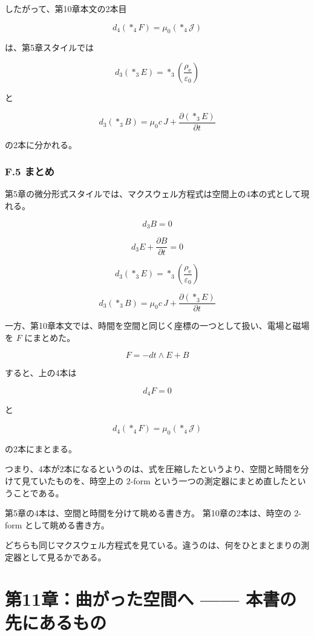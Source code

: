 \documentclass[a4paper,12pt,openany]{book}
\begin{document}
したがって、第10章本文の2本目

\[
d_4(\ast_4F)=\mu_0(\ast_4\mathcal J)
\]

は、第5章スタイルでは

\[
d_3(\ast_3E)=\ast_3\left(\frac{\rho_{\mathrm e}}{\varepsilon_0}\right)
\]

と

\[
d_3(\ast_3B)=\mu_0 c\,J+\frac{\partial(\ast_3E)}{\partial t}
\]

の2本に分かれる。

\hypertarget{f.5-ux307eux3068ux3081}{%
\subsection*{F.5 まとめ}\label{f.5-ux307eux3068ux3081}}

第5章の微分形式スタイルでは、マクスウェル方程式は空間上の4本の式として現れる。

\[
d_3B=0
\]

\[
d_3E+\frac{\partial B}{\partial t}=0
\]

\[
d_3(\ast_3E)=\ast_3\left(\frac{\rho_{\mathrm e}}{\varepsilon_0}\right)
\]

\[
d_3(\ast_3B)=\mu_0 c\,J+\frac{\partial(\ast_3E)}{\partial t}
\]

一方、第10章本文では、時間を空間と同じく座標の一つとして扱い、電場と磁場を
\(F\) にまとめた。

\[
F=-dt\wedge E+B
\]

すると、上の4本は

\[
d_4F=0
\]

と

\[
d_4(\ast_4F)=\mu_0(\ast_4\mathcal J)
\]

の2本にまとまる。

つまり、4本が2本になるというのは、式を圧縮したというより、空間と時間を分けて見ていたものを、時空上の
\(2\)-form という一つの測定器にまとめ直したということである。

第5章の4本は、空間と時間を分けて眺める書き方。 第10章の2本は、時空の
\(2\)-form として眺める書き方。

どちらも同じマクスウェル方程式を見ている。違うのは、何をひとまとまりの測定器として見るかである。

\newpage

\hypertarget{ux7b2c11ux7ae0ux66f2ux304cux3063ux305fux7a7aux9593ux3078-ux672cux66f8ux306eux5148ux306bux3042ux308bux3082ux306e}{%
\chapter{第11章：曲がった空間へ ——
本書の先にあるもの}\label{ux7b2c11ux7ae0ux66f2ux304cux3063ux305fux7a7aux9593ux3078-ux672cux66f8ux306eux5148ux306bux3042ux308bux3082ux306e}}
\end{document}

